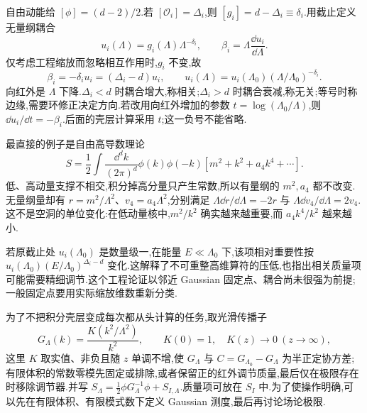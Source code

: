 
自由动能给 $[\phi]=(d-2)/2$.若 $[\mathcal O_i]=\Delta_i$,则 $[g_i]=d-\Delta_i\equiv\delta_i$.用截止定义无量纲耦合
\begin{equation}
 u_i(\Lambda)=g_i(\Lambda)\Lambda^{-\delta_i},\qquad
 \beta_i=\Lambda\frac{\dd u_i}{\dd\Lambda}.
 \label{eq:wilson-dimensionless}
\end{equation}
仅考虑工程缩放而忽略相互作用时,$g_i$ 不变,故
\begin{equation}
 \beta_i=-\delta_i u_i=(\Delta_i-d)u_i,
 \qquad u_i(\Lambda)=u_i(\Lambda_0)
                  (\Lambda/\Lambda_0)^{-\delta_i}.
 \label{eq:canonical-rg-flow}
\end{equation}
向红外是 $\Lambda$ 下降.$\Delta_i<d$ 时耦合增大,称相关;$\Delta_i>d$ 时耦合衰减,称无关;等号时称边缘,需要环修正决定方向.若改用向红外增加的参数 $t=\log(\Lambda_0/\Lambda)$,则 $\dd u_i/\dd t=-\beta_i$.后面的壳层计算采用 $t$;这一负号不能省略.

最直接的例子是自由高导数理论
\begin{equation}
 S=\frac12\int\frac{\dd^dk}{(2\pi)^d}
       \phi(k)\phi(-k)[m^2+k^2+a_4k^4+\cdots].
\end{equation}
低、高动量支撑不相交,积分掉高分量只产生常数,所以有量纲的 $m^2,a_4$ 都不改变.无量纲量却有 $r=m^2/\Lambda^2$、$v_4=a_4\Lambda^2$,分别满足
$\Lambda\dd r/\dd\Lambda=-2r$ 与 $\Lambda\dd v_4/\dd\Lambda=2v_4$.
这不是空洞的单位变化:在低动量核中,$m^2/k^2$ 确实越来越重要,而 $a_4k^4/k^2$ 越来越小.

若原截止处 $u_i(\Lambda_0)$ 是数量级一,在能量 $E\ll\Lambda_0$ 下,该项相对重要性按
$u_i(\Lambda_0)(E/\Lambda_0)^{\Delta_i-d}$ 变化.这解释了不可重整高维算符的压低,也指出相关质量项可能需要精细调节.这个工程论证以邻近 Gaussian 固定点、耦合尚未很强为前提;一般固定点要用实际缩放维数重新分类.


为了不把积分壳层变成每次都从头计算的任务,取光滑传播子
\begin{equation}
 G_\Lambda(k)=\frac{K(k^2/\Lambda^2)}{k^2},\qquad
 K(0)=1,\quad K(z)\to0\ (z\to\infty),
\end{equation}
这里 $K$ 取实值、非负且随 $z$ 单调不增,使 $G_\Lambda$ 与 $C=G_{\Lambda_0}-G_\Lambda$ 为半正定协方差;有限体积的常数零模先固定或排除,或者保留正的红外调节质量,最后仅在极限存在时移除调节器.并写 $S_\Lambda=\tfrac12\phi G_\Lambda^{-1}\phi+S_{I,\Lambda}$.质量项可放在 $S_I$ 中.为了使操作明确,可以先在有限体积、有限模式数下定义 Gaussian 测度,最后再讨论场论极限.


